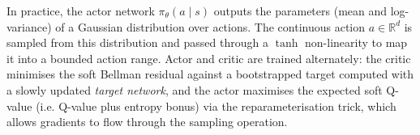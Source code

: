 In practice, the actor network $\pi_\theta(a \mid s)$ outputs the parameters (mean and log-variance) of a Gaussian distribution over actions. The continuous action $a \in \mathbb{R}^d$ is sampled from this distribution and passed through a $\tanh$ non-linearity to map it into a bounded action range. Actor and critic are trained alternately: the critic minimises the soft Bellman residual against a bootstrapped target computed with a slowly updated \emph{target network}, and the actor maximises the expected soft Q-value (i.e. Q-value plus entropy bonus) via the reparameterisation trick, which allows gradients to flow through the sampling operation.
